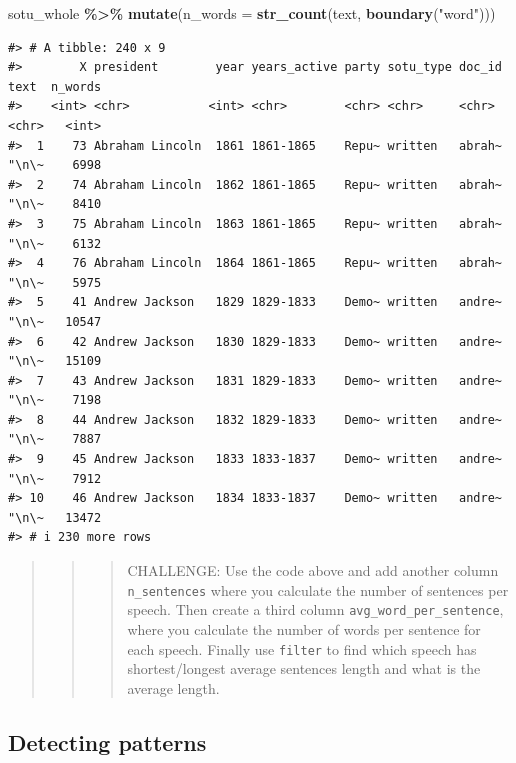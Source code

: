 \documentclass[
]{book}
\newenvironment{Shaded}{\begin{snugshade}}{\end{snugshade}}
\newcommand{\AttributeTok}[1]{\textcolor[rgb]{0.13,0.29,0.53}{#1}}
\newcommand{\FunctionTok}[1]{\textcolor[rgb]{0.13,0.29,0.53}{\textbf{#1}}}
\newcommand{\NormalTok}[1]{#1}
\newcommand{\SpecialCharTok}[1]{\textcolor[rgb]{0.81,0.36,0.00}{\textbf{#1}}}
\newcommand{\StringTok}[1]{\textcolor[rgb]{0.31,0.60,0.02}{#1}}
\begin{document}
\begin{Shaded}
\begin{Highlighting}[]
\NormalTok{sotu\_whole }\SpecialCharTok{\%\textgreater{}\%} 
  \FunctionTok{mutate}\NormalTok{(}\AttributeTok{n\_words =} \FunctionTok{str\_count}\NormalTok{(text, }\FunctionTok{boundary}\NormalTok{(}\StringTok{"word"}\NormalTok{))) }
\end{Highlighting}
\end{Shaded}

\begin{verbatim}
#> # A tibble: 240 x 9
#>        X president        year years_active party sotu_type doc_id text  n_words
#>    <int> <chr>           <int> <chr>        <chr> <chr>     <chr>  <chr>   <int>
#>  1    73 Abraham Lincoln  1861 1861-1865    Repu~ written   abrah~ "\n\~    6998
#>  2    74 Abraham Lincoln  1862 1861-1865    Repu~ written   abrah~ "\n\~    8410
#>  3    75 Abraham Lincoln  1863 1861-1865    Repu~ written   abrah~ "\n\~    6132
#>  4    76 Abraham Lincoln  1864 1861-1865    Repu~ written   abrah~ "\n\~    5975
#>  5    41 Andrew Jackson   1829 1829-1833    Demo~ written   andre~ "\n\~   10547
#>  6    42 Andrew Jackson   1830 1829-1833    Demo~ written   andre~ "\n\~   15109
#>  7    43 Andrew Jackson   1831 1829-1833    Demo~ written   andre~ "\n\~    7198
#>  8    44 Andrew Jackson   1832 1829-1833    Demo~ written   andre~ "\n\~    7887
#>  9    45 Andrew Jackson   1833 1833-1837    Demo~ written   andre~ "\n\~    7912
#> 10    46 Andrew Jackson   1834 1833-1837    Demo~ written   andre~ "\n\~   13472
#> # i 230 more rows
\end{verbatim}

\begin{quote}
\begin{quote}
\begin{quote}
CHALLENGE: Use the code above and add another column \texttt{n\_sentences} where you calculate the number of sentences per speech. Then create a third column \texttt{avg\_word\_per\_sentence}, where you calculate the number of words per sentence for each speech. Finally use \texttt{filter} to find which speech has shortest/longest average sentences length and what is the average length.
\end{quote}
\end{quote}
\end{quote}

\subsection{Detecting patterns}\label{detecting-patterns}
\end{document}
